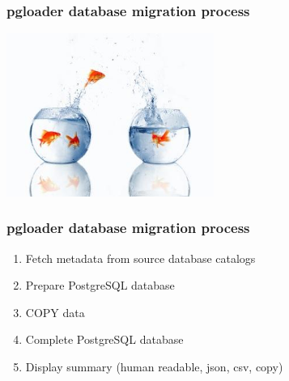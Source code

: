 \documentclass{beamer}
\begin{document}
\begin{frame}
  \frametitle{pgloader database migration process}

  \begin{center}
    \includegraphics[height=2.1in]{migration.jpg}
  \end{center}
\end{frame}

\begin{frame}[fragile]
  \frametitle{pgloader database migration process}

  \vfill
  
  \begin{enumerate}
  \item Fetch metadata from source database catalogs
  \item Prepare PostgreSQL database
  \item COPY data
  \item Complete PostgreSQL database
  \item Display summary (human readable, json, csv, copy)
  \end{enumerate}
\end{frame}
\end{document}
